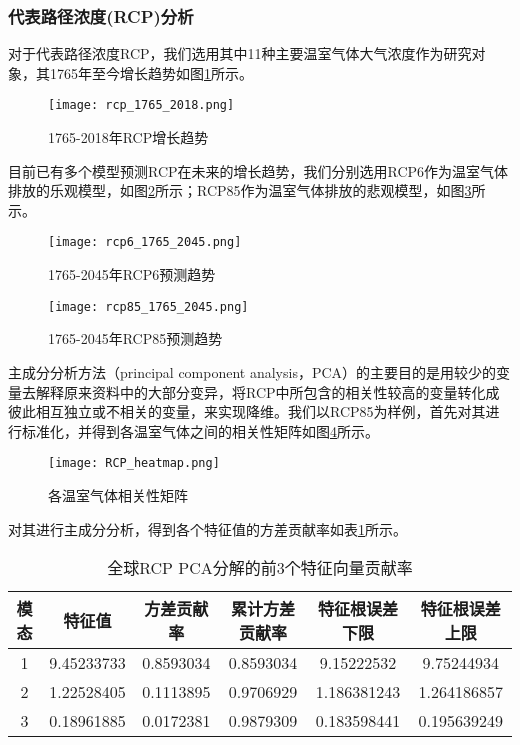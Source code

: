 \documentclass[bwprint]{gmcmthesis}
\begin{document}
\subsubsection{代表路径浓度(RCP)分析}

对于代表路径浓度RCP，我们选用其中11种主要温室气体大气浓度作为研究对象，其1765年至今增长趋势如图\ref{rcp_1765_2018}所示。

\begin{figure}[!h]
\centering
\texttt{[image: rcp\_1765\_2018.png]}
\caption{1765-2018年RCP增长趋势}\label{rcp_1765_2018}
\end{figure}

目前已有多个模型预测RCP在未来的增长趋势，我们分别选用RCP6作为温室气体排放的乐观模型，如图\ref{rcp6}所示；RCP85作为温室气体排放的悲观模型，如图\ref{rcp85}所示\cite{Hastenrath1995Recent}。

\begin{figure}[!h]
\centering
\texttt{[image: rcp6\_1765\_2045.png]}
\caption{1765-2045年RCP6预测趋势}\label{rcp6}
\end{figure}

\begin{figure}[!h]
\centering
\texttt{[image: rcp85\_1765\_2045.png]}
\caption{1765-2045年RCP85预测趋势}\label{rcp85}
\end{figure}

主成分分析方法（principal component analysis，PCA）的主要目的是用较少的变量去解释原来资料中的大部分变异，将RCP中所包含的相关性较高的变量转化成彼此相互独立或不相关的变量，来实现降维。我们以RCP85为样例，首先对其进行标准化，并得到各温室气体之间的相关性矩阵如图\ref{hm}所示。
\begin{figure}[!h]
\centering
\texttt{[image: RCP\_heatmap.png]}
\caption{各温室气体相关性矩阵}\label{hm}
\end{figure}

对其进行主成分分析，得到各个特征值的方差贡献率如表\ref{RCP_PCA}所示。

\begin{table}[!h]
\centering
\caption{全球RCP PCA分解的前3个特征向量贡献率}\label{RCP_PCA}%
\begin{tabular}{cccccc}
\toprule  %
模态& 特征值& 方差贡献率& 累计方差贡献率& 特征根误差下限& 特征根误差上限\\
\midrule  %
1& 9.45233733& 0.8593034& 0.8593034& 9.15222532& 9.75244934\\
2& 1.22528405& 0.1113895& 0.9706929& 1.186381243& 1.264186857\\
3& 0.18961885& 0.0172381& 0.9879309& 0.183598441& 0.195639249\\
\bottomrule %
\end{tabular}
\end{table}
\end{document}
